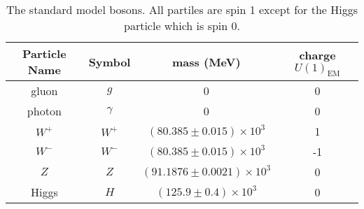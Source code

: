 \begin{table}
  \centering
  \begin{tabular}{c c c c}
    Particle Name & Symbol    & mass (MeV)                      & charge $U(1)_{\mbox{EM}}$ \\
    \hline
    gluon         & $g$       & 0                               &  0                        \\
    photon        & $\gamma$  & 0                               &  0                        \\
    $W^+$         & $W^+$     & $(80.385\pm0.015)\times10^3$    &  1                        \\
    $W^-$         & $W^-$     & $(80.385\pm0.015)\times10^3$    & -1                        \\
    $Z$           & $Z$       & $(91.1876\pm0.0021)\times10^3$  &  0                        \\
    Higgs         & $H$       & $(125.9\pm0.4)\times10^3$       &  0
  \end{tabular}
  \label{table:bosons}
  \caption{The standard model bosons.  All partiles are spin 1 except for the Higgs particle which is spin 0.}
\end{table}
